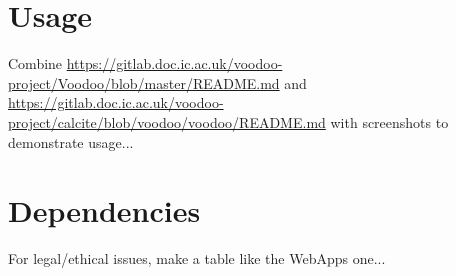 \appendix
\chapter{Usage}

Combine \url{https://gitlab.doc.ic.ac.uk/voodoo-project/Voodoo/blob/master/README.md} and \url{https://gitlab.doc.ic.ac.uk/voodoo-project/calcite/blob/voodoo/voodoo/README.md} with screenshots to demonstrate usage...

\chapter{Dependencies}

For legal/ethical issues, make a table like the WebApps one...
